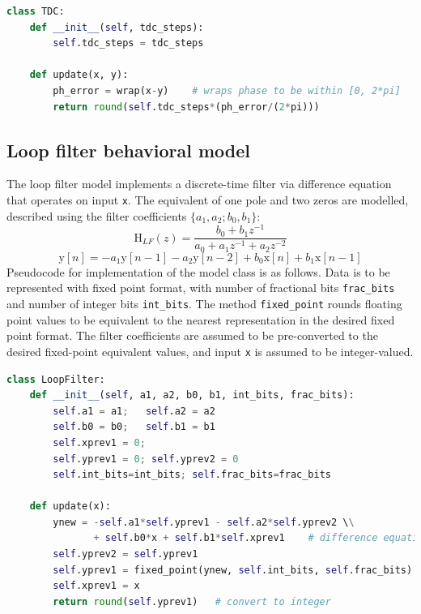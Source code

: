 \begin{lstlisting}[language={Python}, caption={TDC behavioral model Python pseudocode.}, label={tdc_code}]
class TDC:
	def __init__(self, tdc_steps):
		self.tdc_steps = tdc_steps

	def update(x, y):
		ph_error = wrap(x-y) 	# wraps phase to be within [0, 2*pi]
		return round(self.tdc_steps*(ph_error/(2*pi)))
\end{lstlisting}
\subsection{Loop filter behavioral model}
The loop filter model implements a discrete-time filter via difference equation that operates on input \texttt{x}. The equivalent of one pole and two zeros are modelled, described using the filter coefficients $\{a_1, a_2; b_0, b_1\}$:
\begin{equation}
\text{H}_{LF}(z) = \frac{b_0 + b_1z^{-1}}{a_0 + a_1z^{-1} + a_2z^{-2}}
\end{equation}
\begin{equation}
\text{y}[n] = -a_1 \text{y}[n-1]-a_2 \text{y}[n-2] + b_0\text{x}[n] + b_1\text{x}[n-1]
\end{equation}
Pseudocode for implementation of the model class is as follows. Data is to be represented with fixed point format, with number of fractional bits \texttt{frac\_bits} and number of integer bits \texttt{int\_bits}. The method \texttt{fixed\_point} rounds floating point values to be equivalent to the nearest representation in the desired fixed point format. The filter coefficients are assumed to be pre-converted to the desired fixed-point equivalent values, and input \texttt{x} is assumed to be integer-valued.
\begin{lstlisting}[language={Python}, caption={Loop filter behavioral model Python pseudocode.}, label={lf_code}]
class LoopFilter:
	def __init__(self, a1, a2, b0, b1, int_bits, frac_bits):
		self.a1 = a1;	self.a2 = a2
		self.b0 = b0;	self.b1 = b1
		self.xprev1 = 0;	
		self.yprev1 = 0; self.yprev2 = 0
		self.int_bits=int_bits;	self.frac_bits=frac_bits

	def update(x):
		ynew = -self.a1*self.yprev1 - self.a2*self.yprev2 \\
			   + self.b0*x + self.b1*self.xprev1	# difference equation
		self.yprev2 = self.yprev1	
		self.yprev1 = fixed_point(ynew, self.int_bits, self.frac_bits)
		self.xprev1 = x
		return round(self.yprev1)	# convert to integer
\end{lstlisting}

